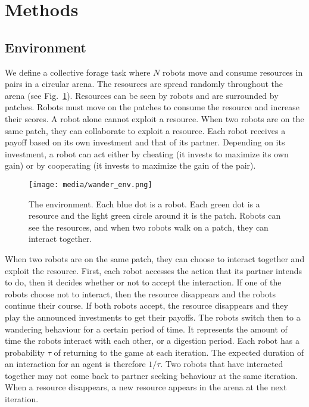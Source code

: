 \documentclass[letterpaper]{article}
\begin{document}
\section{Methods}

\subsection{Environment}

We define a collective forage task where $N$ robots move and consume resources in pairs in a circular arena. The resources are spread randomly throughout the arena (see Fig.~\ref{fig:env}). Resources can be seen by robots and are surrounded by patches. Robots must move on the patches to consume the resource and increase their scores. A robot alone cannot exploit a resource. When two robots are on the same patch, they can collaborate to exploit a resource. Each robot receives a payoff based on its own investment and that of its partner. Depending on its investment, a robot can act either by cheating (it invests to maximize its own gain) or by cooperating (it invests to maximize the gain of the pair). 

\begin{figure}
    \begin{center}
        \texttt{[image: media/wander\_env.png]}
        \vskip 0.25cm
        \caption{The environment. Each blue dot is a robot. Each green dot is a resource and the light green circle around it is the patch. Robots can see the resources, and when two robots walk on a patch, they can interact together.
        }
    \label{fig:env}
    \end{center}
\end{figure}

When two robots are on the same patch, they can choose to interact together and exploit the resource. First, each robot accesses the action that its partner intends to do, then it decides whether or not to accept the interaction. If one of the robots choose not to interact, then the resource disappears and the robots continue their course. If both robots accept, the resource disappears and they play the announced investments to get their payoffs. The robots switch then to a wandering behaviour for a certain period of time. It represents the amount of time the robots interact with each other, or a digestion period. Each robot has a probability $\tau$ of returning to the game at each iteration. The expected duration of an interaction for an agent is therefore $1/\tau$. Two robots that have interacted together may not come back to partner seeking behaviour at the same iteration. When a resource disappears, a new resource appears in the arena at the next iteration.
\end{document}
